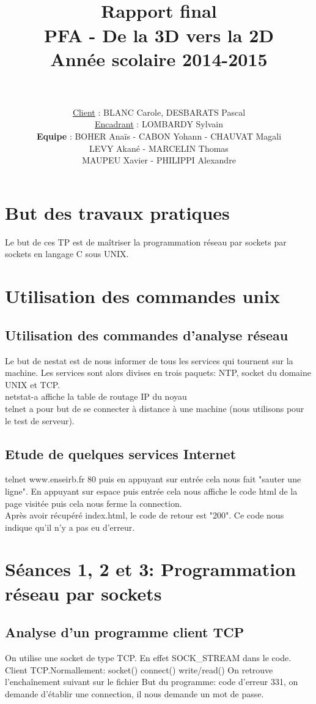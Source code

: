 \documentclass[paper=a4, fontsize=12pt]{article}
\title{
  \usefont{OT1}{bch}{b}{n}
  \horrule{1.5pt} \\[0.5cm]	
  \Huge \textbf{Rapport final} \\ [10pt]
  \Huge PFA - De la 3D vers la 2D \\ [15pt]
  \LARGE Année scolaire 2014-2015 \\ 
  \horrule{1.5pt} \\[0.5cm]
}
\author{
  \huge \underline{Client} : \LARGE BLANC Carole, DESBARATS Pascal\\ [10pt] 
  \huge \underline{Encadrant} : \LARGE LOMBARDY Sylvain\\[20pt]
  \normalfont 							
  \huge \textbf{Equipe} : \Large BOHER Anaïs - CABON Yohann - CHAUVAT Magali \\[5pt]
  \Large LEVY Akané - MARCELIN Thomas \\[5pt]
  \Large MAUPEU Xavier - PHILIPPI Alexandre \\[10pt]		\normalsize
}
\date{}
\numberwithin{equation}{section}		%
\numberwithin{figure}{section}			%
\numberwithin{table}{section}				%
\begin{document}
\maketitle
\newpage

\tableofcontents

\newpage

\section{But des travaux pratiques}
Le but de ces TP est de maîtriser la programmation réseau par sockets par sockets en langage C sous UNIX.
\section{Utilisation des commandes unix}
\subsection{Utilisation des commandes d'analyse réseau}
Le but de nestat est de nous informer de tous les services qui tournent sur la machine. Les services sont alors divises en trois paquets: NTP, socket du domaine UNIX et TCP.
\\netstat-a affiche la table de routage IP du noyau
\\telnet a pour but de se connecter à distance à une machine (nous utilisons pour le test de serveur).
\subsection{Etude de quelques services Internet}
telnet www.enseirb.fr 80 puis en appuyant sur entrée cela nous fait "sauter une ligne". En appuyant sur espace puis entrée cela nous affiche le code html de la page visitée puis cela nous ferme la connection.
\\Après avoir récupéré index.html, le code de retour est "200". Ce code nous indique qu'il n'y a pas eu d'erreur.
\section{Séances 1, 2 et 3: Programmation réseau par sockets}
\subsection{Analyse d'un programme client TCP}
On utilise une socket de type TCP. En effet SOCK_STREAM dans le code. 
Client TCP.Normallement:
socket()
connect()
write/read()
On retrouve l'enchaînement suivant sur le fichier
But du programme: code d'erreur 331, on demande d'établir une connection, il nous demande un mot de passe.
\end{document}
